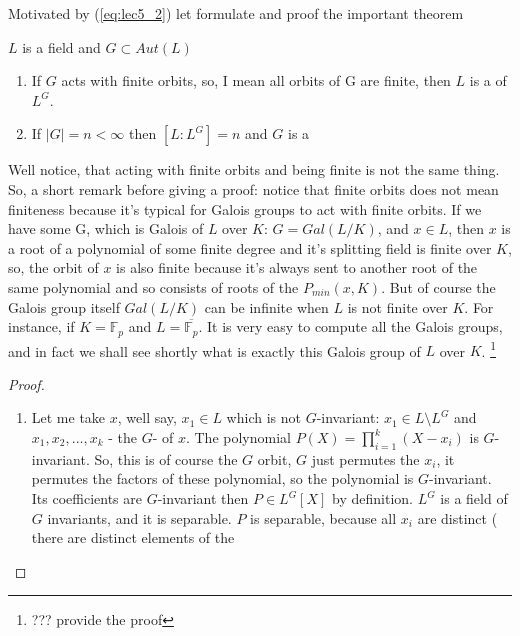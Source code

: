 Motivated by (\ref{eq:lec5_2}) let formulate and proof the important
theorem
\begin{theorem}[Artin]
  $L$ is a field and $G \subset Aut\left(L\right)$
  \begin{enumerate}
  \item If $G$ acts with finite orbits,  so, I mean all orbits of G
    are finite, then $L$ is a  of $L^G$.
  \item If $\left|G\right| = n < \infty$ then
    $\left[L : L^G\right] = n$ and $G$ is a 
  \end{enumerate}

  \begin{remark}
    Well notice, that acting with finite orbits  and being finite is not
    the same thing. So, a short remark before giving a proof: notice
    that finite orbits does not mean finiteness because it's typical for
    Galois groups to act with finite orbits.  If we have some G, which
    is Galois of $L$ over $K$: $G = Gal\left(L/K\right)$, and
    $x \in L$, then $x$ is a root of a 
    polynomial of some finite degree  and it's splitting field is
    finite over $K$, so, the orbit of $x$ is also finite 
    because it's always sent to another root of the
    same polynomial and so consists of roots of  the
    $P_{min}\left(x, K\right)$. But of course the Galois group itself
    $Gal\left(L/K\right)$ can be infinite when $L$ is not finite over $K$. For
    instance, if  $K  = \mathbb{F}_p$ and $L = \overline{\mathbb{F}_p}$. It is
    very easy to compute all the Galois groups, and in fact we shall see
    shortly what is exactly this Galois group of $L$ over $K$.
    \footnote{
      ??? provide the proof
    }
  \end{remark}
  \begin{proof}
    \begin{enumerate}
    \item  Let me take $x$, well say, $x_1 \in L$ which is not
      $G$-invariant: $x_1 \in L \setminus L^G$ and
      $x_1, x_2, \dots, x_k$ - the $G$- of $x$. The
      polynomial $P\left(X\right) = \prod_{i=1}^k\left(X - x_i\right)$
      is $G$-invariant. So, this is of course the $G$ orbit, $G$ just
      permutes  the $x_i$, it permutes the factors of these polynomial,
      so the polynomial is $G$-invariant. Its coefficients are
      $G$-invariant then $P \in L^G\left[X\right]$ by definition. $L^G$
      is a field of $G$ invariants, and it is separable. $P$ is separable,
      because all $x_i$ are distinct ( there are distinct elements of the

\end{enumerate}
\end{proof}
\end{theorem}
